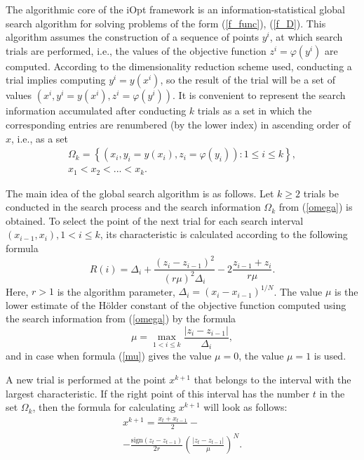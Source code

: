 \documentclass[iicol]{sn-jnl}
\theoremstyle{thmstyleone}%
\theoremstyle{thmstyletwo}%
\theoremstyle{thmstylethree}%
\begin{document}
The algorithmic core of the iOpt framework is an information-statistical global search algorithm for solving problems of the form (\ref{f_func}), (\ref{f_D}). This algorithm assumes the construction of a sequence of points $y^i$,  at which search trials are performed, i.e., the values of the objective function $z^i = \varphi(y^i)$ are computed. According to the dimensionality reduction scheme used, conducting a trial implies computing $y^i=y(x^i)$, so the result of the trial will be a set of values $(x^i, y^i=y(x^i), z^i = \varphi(y^i))$. 
It is convenient to represent the search information accumulated after conducting $k$ trials as a set in which the corresponding entries are renumbered (by the lower index) in ascending order of $x$, i.e., as a set 
\begin{multline}\label{omega}
\Omega_k = \left\{  (x_i, y_i=y(x_i), z_i = \varphi(y_i)): 1 \leq i \leq k  \right\},\\
x_1 < x_2 < ... < x_k.
\end{multline}

The main idea of the global search algorithm is as follows. Let $k \geq 2$ trials be conducted in the search process and the search information $\Omega_k$ from (\ref{omega}) is obtained. To select the point of the next trial for each search interval $(x_{i-1},x_i), 1<i\leq k$, its characteristic is calculated according to the following formula
\begin{equation}\label{R}
R(i) = \Delta_i + \frac{(z_i-z_{i-1})^2}{(r\mu)^2\Delta_i}-2\frac{z_{i-1}+z_i}{r\mu}.	
\end{equation}
Here, $r>1$ is the algorithm parameter, $\Delta_i=(x_i-x_{i-1})^{1/N}$.  The value $\mu$ is the lower estimate of the H\"older constant of the objective function computed using the search information from (\ref{omega}) by the formula
\begin{equation}\label{mu}
\mu = \max_{1<i\leq k}\frac{\left|z_i-z_{i-1}\right|}{\Delta_i},
\end{equation}
and in case when formula (\ref{mu}) gives the value $\mu=0$, the value $\mu=1$ is used.

A new trial is performed at the point $x^{k+1}$ that belongs to the interval
with the largest characteristic. If the right point of this interval has the number $t$ in the set $\Omega_k$, then the formula for calculating $x^{k+1}$ will look as follows:
\begin{multline}\label{xk1}
x^{k+1}=\frac{x_t+x_{t-1}}{2}-\\
-\frac{\mathrm{sign}(z_t-z_{t-1})}{2r}\left(\frac{\left|z_t-z_{t-1}\right|}{\mu}\right)^N.   
\end{multline}
\end{document}
